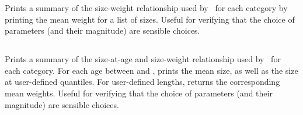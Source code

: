 Prints a summary of the size-weight relationship used by \SPM\ for each category by printing the mean weight for a list of sizes. Useful for verifying that the choice of parameters (and their magnitude) are sensible choices.

\TOUNDOend

\subsection{\label{sec:report-age-size-weight}}

\TODO

Prints a summary of the size-at-age and size-weight relationship used by \SPM\ for each category. For each age between  and , prints the mean size, as well as the size at user-defined quantiles. For user-defined lengths, returns the corresponding mean weights. Useful for verifying that the choice of parameters (and their magnitude) are sensible choices.

\TODOend